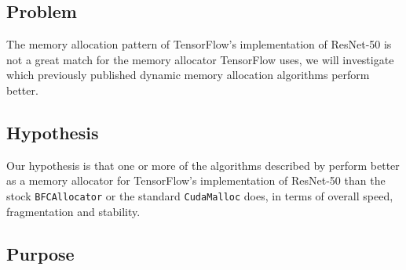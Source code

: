 \documentclass[12pt,twoside]{article}
\begin{document}
\subsection{Problem}
\label{sec:problem}



The memory allocation pattern of TensorFlow's implementation of ResNet-50 is not a great match for the memory allocator TensorFlow uses, we will investigate which previously published dynamic memory allocation algorithms perform better.



\subsection{Hypothesis}
\label{sec:hypothesis}


Our hypothesis is that one or more of the algorithms described by \citeauthor{Vinkler2015} \cite{Vinkler2015} perform better as a memory allocator for TensorFlow's implementation of ResNet-50 than the stock \texttt{BFCAllocator} or the standard \texttt{CudaMalloc} does, in terms of overall speed, fragmentation and stability.


\subsection{Purpose}
\label{sec:purpose}

\end{document}
